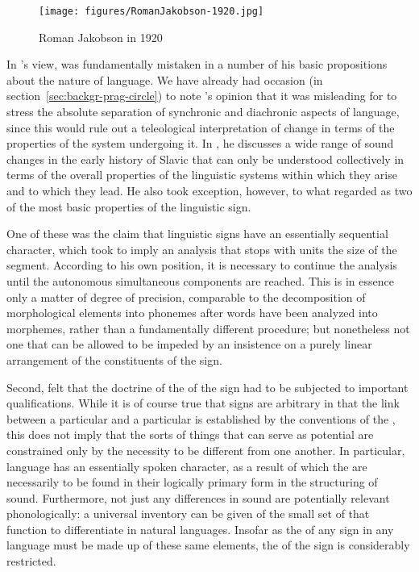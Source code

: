 \begin{wrapfigure}{l}{.35\textwidth}
  \texttt{[image: figures/RomanJakobson-1920.jpg]}
  \caption{Roman Jakobson in 1920}
  \label{fig:ch.jakobson_jakobson_1920}
\end{wrapfigure}
In {\Jakobson}'s view, {\Saussure} was fundamentally mistaken in a number of
his basic propositions about the nature of language. We have already
had occasion (in section~\ref{sec:backgr-prag-circle}) to note
{\Jakobson}'s opinion that it was misleading for {\Saussure} to {stress} the
absolute separation of synchronic and diachronic aspects of language,
since this would rule out a teleological interpretation of change in
terms of the properties of the system undergoing it. In
\citet{jakobson29:remarks}, he discusses a wide range of
sound changes in the early history of Slavic that can only be
understood collectively in terms of the overall properties of the
linguistic systems within which they arise and to which they lead.  He
also took exception, however, to what {\Saussure} regarded as two of the
most basic properties of the linguistic sign.

One of these was the claim that linguistic signs have an essentially
sequential character, which {\Jakobson} took to imply an analysis that
{stops} with units the size of the segment. According to his own
position, it is necessary to continue the analysis until the
autonomous simultaneous components are reached. This is in essence
only a matter of degree of precision, comparable to the decomposition
of morphological elements into phonemes after words have been analyzed
into morphemes, rather than a fundamentally different procedure; but
nonetheless not one that can be allowed to be impeded by an insistence
on a purely linear arrangement of the constituents of the sign.

Second, {\Jakobson} felt that the doctrine of the  of the
sign had to be subjected to important qualifications. While it is of
course true that signs are arbitrary in that the link between a
particular \emph{} and a particular \emph{} is
established by the conventions of the , this does not
imply that the sorts of things that can serve as potential 
are constrained only by the necessity to be different from one
another. In particular, language has an essentially spoken character,
as a result of which the \emph{} are necessarily to be
found in their logically primary form in the structuring of
sound. Furthermore, not just any differences in sound are potentially
relevant phonologically: a universal inventory can be given of the
small set of  that function to differentiate
\emph{} in natural languages. Insofar as the
\emph{} of any sign in any language must be made up of these
same elements, the  of the sign is considerably
restricted.

